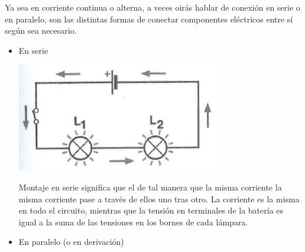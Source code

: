 \documentclass[a5paper,twoside,openany]{book}
\begin{document}
Ya sea en corriente continua o alterna, a veces oirás hablar de conexión en serie o en paralelo, son las distintas formas de conectar componentes eléctricos entre sí según sea necesario.
\begin{itemize}
\item En serie

\noindent\begin{minipage}[t]{0.5\textwidth}\vspace{0pt}
\includegraphics[width=\linewidth]{circuito-serie}
\end{minipage}%
\hfill%
\begin{minipage}[t]{0.45\textwidth}\vspace{0pt}
Montaje en serie significa que el
de tal manera que la misma corriente
la misma corriente pase a través de ellos
 uno tras otro.
La corriente es la misma en todo el
circuito, mientras que la tensión en
terminales de la batería es igual a la suma
de las tensiones en los bornes de cada
lámpara.
\end{minipage}

\item En paralelo (o en derivación)


\end{itemize}
\end{document}
